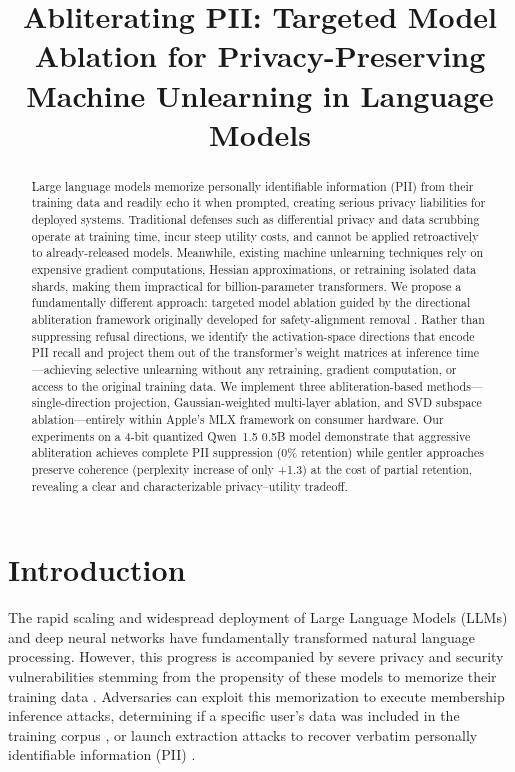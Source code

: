 \documentclass[11pt]{article}
\title{Abliterating PII: Targeted Model Ablation for Privacy-Preserving\\Machine Unlearning in Language Models}
\author{}
\begin{document}
\maketitle
\begin{abstract}
Large language models memorize personally identifiable information (PII) from their training data and readily echo it when prompted, creating serious privacy liabilities for deployed systems. Traditional defenses such as differential privacy and data scrubbing operate at training time, incur steep utility costs, and cannot be applied retroactively to already-released models. Meanwhile, existing machine unlearning techniques rely on expensive gradient computations, Hessian approximations, or retraining isolated data shards, making them impractical for billion-parameter transformers. We propose a fundamentally different approach: targeted model ablation guided by the directional abliteration framework originally developed for safety-alignment removal \citep{heretic2025, arditi2024refusal}. Rather than suppressing refusal directions, we identify the activation-space directions that encode PII recall and project them out of the transformer's weight matrices at inference time---achieving selective unlearning without any retraining, gradient computation, or access to the original training data. We implement three abliteration-based methods---single-direction projection, Gaussian-weighted multi-layer ablation, and SVD subspace ablation---entirely within Apple's MLX framework on consumer hardware. Our experiments on a 4-bit quantized Qwen~1.5 0.5B model demonstrate that aggressive abliteration achieves complete PII suppression (0\% retention) while gentler approaches preserve coherence (perplexity increase of only +1.3) at the cost of partial retention, revealing a clear and characterizable privacy--utility tradeoff.
\end{abstract}

\section{Introduction}

The rapid scaling and widespread deployment of Large Language Models (LLMs) and deep neural networks have fundamentally transformed natural language processing. However, this progress is accompanied by severe privacy and security vulnerabilities stemming from the propensity of these models to memorize their training data \citep{carlini2021extracting}. Adversaries can exploit this memorization to execute membership inference attacks, determining if a specific user's data was included in the training corpus \citep{shokri2017membership}, or launch extraction attacks to recover verbatim personally identifiable information (PII) \citep{lukas2023analyzing}.
\end{document}
